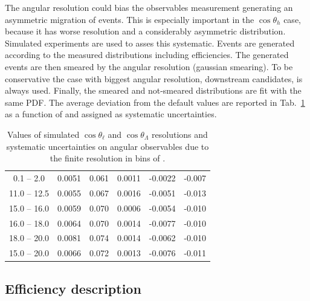 The angular resolution could bias the observables measurement 
generating an asymmetric migration of events.
This is especially important in the $\cos \theta_h$ case, because it has worse resolution
and a considerably asymmetric distribution. Simulated experiments are used to asses this systematic.
Events are generated according to the measured distributions including efficiencies.
The generated events are then smeared by the angular resolution (gaussian smearing).
To be conservative the case with biggest angular resolution, downstream candidates, is always used.
Finally, the smeared and not-smeared distributions are fit with the same PDF.  
The average deviation from the default values are reported in Tab.~\ref{tab:resolSys}
as a function of \qsq and assigned as systematic uncertainties.
%
\begin{table}[h]
\centering
\caption{Values of simulated $\cos\theta_\ell$ and $\cos\theta_\Lambda$ 
resolutions and systematic uncertainties on angular observables due to
the finite resolution in bins of \qsq.}
\begin{tabular}{c|ccccc}
 \boldmath{ \qsq [\gevgevcccc] } &  \boldmath{ $\sigma_\ell$ }    &  \boldmath{ $\sigma_\Lambda$}   & \boldmath{ $\Delta \afbl$} &  \boldmath{ $\Delta \fl$} & \boldmath{ $\Delta \afbh$ } \\ \hline
\phantom{x}0.1 -- 2.0\phantom{x}  & 0.0051 & 0.061 & 0.0011 & -0.0022 & -0.007 \\ 
11.0 -- 12.5 & 0.0055 & 0.067 & 0.0016 & -0.0051 & -0.013 \\
15.0 -- 16.0 & 0.0059 & 0.070 & 0.0006 & -0.0054 & -0.010 \\
16.0 -- 18.0 & 0.0064 & 0.070 & 0.0014 & -0.0077 & -0.010 \\
18.0 -- 20.0 & 0.0081 & 0.074 & 0.0014 & -0.0062 & -0.010 \\
\hline
15.0 -- 20.0 & 0.0066 & 0.072 & 0.0013 & -0.0076 & -0.011 \\
\end{tabular}
\label{tab:resolSys}
\end{table}


\subsection{Efficiency description}


